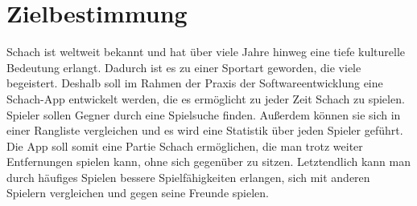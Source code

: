 \documentclass[parskip=full]{scrartcl}
\begin{document}
	\begin{titlepage}
		
		
		
		\newpage	
		\tableofcontents
		\pagebreak
		
	\end{titlepage}
	\section{Zielbestimmung}
	
	\gls{Schach} ist weltweit bekannt und hat über viele Jahre hinweg eine tiefe kulturelle Bedeutung erlangt. Dadurch ist es zu einer Sportart geworden, die viele begeistert.
	Deshalb soll im Rahmen der Praxis der Softwareentwicklung eine \gls{Schach}-App entwickelt werden, die es ermöglicht zu jeder Zeit Schach zu spielen.
	Spieler sollen Gegner durch eine Spielsuche finden. Außerdem können sie sich in einer Rangliste vergleichen und es wird eine Statistik über jeden Spieler geführt.
	Die App soll somit eine Partie \gls{Schach} ermöglichen, die man trotz weiter Entfernungen spielen kann, ohne sich gegenüber zu sitzen.
	Letztendlich kann man durch häufiges Spielen bessere Spielfähigkeiten erlangen, sich mit anderen Spielern vergleichen und gegen seine Freunde spielen.
	
\end{document}

